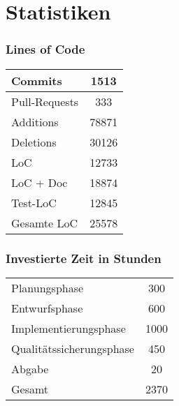 \section{Statistiken}

\begin{frame}\frametitle{Lines of Code}
    \centering
    \begin{tabular}{l|c}
        Commits & 1513 \\
        \hline
        Pull-Requests & 333 \\
        \hline
        Additions & 78871\\
        \hline
        Deletions & 30126 \\
        \hline
        LoC & 12733 \\
        \hline
        LoC + Doc & 18874 \\
        \hline
        Test-LoC & 12845 \\
        \hline
        \hline
        Gesamte LoC & 25578
    \end{tabular}
\end{frame}

\begin{frame}\frametitle{Investierte Zeit in Stunden}
    \centering
    \begin{tabular}{l|c}
        Planungsphase & 300 \\
        Entwurfsphase & 600 \\
        Implementierungsphase & 1000\\
        Qualitätssicherungsphase & 450 \\
        Abgabe & 20 \\
        \hline
        \hline
        Gesamt & 2370
    \end{tabular}
\end{frame}
